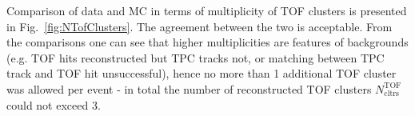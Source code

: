 Comparison of data and MC in terms of multiplicity of TOF clusters is presented in Fig.~\ref{fig:NTofClusters}. The agreement between the two is acceptable. From the comparisons one can see that higher multiplicities are features of backgrounds (e.g. TOF hits reconstructed but TPC tracks not, or matching between TPC track and TOF hit unsuccessful), hence no more than 1 additional TOF cluster was allowed per event - in total the number of reconstructed TOF clusters $N^{\text{TOF}}_{\text{cltrs}}$ could not exceed 3.




\begin{figure}[ht!]
\centering
\parbox{0.475\textwidth}{
  \centering
  \begin{subfigure}[b]{\linewidth}{
                }
  \end{subfigure}
}
\quad
\parbox{0.475\textwidth}{
  \centering
  \begin{subfigure}[b]{\linewidth}{
                }

\end{subfigure}}
\end{figure}
